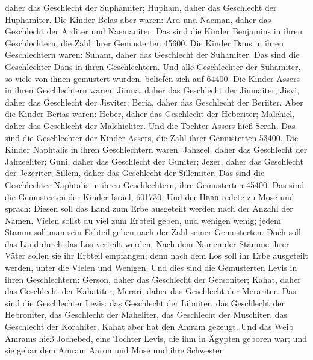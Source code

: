 daher das Geschlecht der Suphamiter; Hupham, daher das Geschlecht der
Huphamiter.  Die Kinder Belas aber waren: Ard und Naeman,
daher das Geschlecht der Arditer und Naemaniter.  Das
sind die Kinder Benjamins in ihren Geschlechtern, die Zahl ihrer
Gemusterten 45600.  Die Kinder Dans in ihren
Geschlechtern waren: Suham, daher das Geschlecht der Suhamiter. Das sind
die Geschlechter Dans in ihren Geschlechtern.  Und alle
Geschlechter der Suhamiter, so viele von ihnen gemustert wurden,
beliefen sich auf 64400.  Die Kinder Assers in ihren
Geschlechtern waren: Jimna, daher das Geschlecht der Jimnaiter; Jisvi,
daher das Geschlecht der Jisviter; Beria, daher das Geschlecht der
Beriiter.  Aber die Kinder Berias waren: Heber, daher das
Geschlecht der Heberiter; Malchiel, daher das Geschlecht der
Malchieliter.  Und die Tochter Assers hieß Serah.
 Das sind die Geschlechter der Kinder Assers, die Zahl
ihrer Gemusterten 53400.  Die Kinder Naphtalis in ihren
Geschlechtern waren: Jahzeel, daher das Geschlecht der Jahzeeliter;
Guni, daher das Geschlecht der Guniter;  Jezer, daher das
Geschlecht der Jezeriter; Sillem, daher das Geschlecht der Sillemiter.
 Das sind die Geschlechter Naphtalis in ihren
Geschlechtern, ihre Gemusterten 45400.  Das sind die
Gemusterten der Kinder Israel, 601730.  Und der
\textsc{Herr} redete zu Mose und sprach:  Diesen soll das
Land zum Erbe ausgeteilt werden nach der Anzahl der Namen.
 Vielen sollst du viel zum Erbteil geben, und wenigen
wenig; jedem Stamm soll man sein Erbteil geben nach der Zahl seiner
Gemusterten.  Doch soll das Land durch das Los verteilt
werden. Nach dem Namen der Stämme ihrer Väter sollen sie ihr Erbteil
empfangen;  denn nach dem Los soll ihr Erbe ausgeteilt
werden, unter die Vielen und Wenigen.  Und dies sind die
Gemusterten Levis in ihren Geschlechtern: Gerson, daher das Geschlecht
der Gersoniter; Kahat, daher das Geschlecht der Kahatiter; Merari, daher
das Geschlecht der Merariter.  Das sind die Geschlechter
Levis: das Geschlecht der Libniter, das Geschlecht der Hebroniter, das
Geschlecht der Maheliter, das Geschlecht der Muschiter, das Geschlecht
der Korahiter. Kahat aber hat den Amram gezeugt.  Und das
Weib Amrams hieß Jochebed, eine Tochter Levis, die ihm in Ägypten
geboren war; und sie gebar dem Amram Aaron und Mose und ihre Schwester
